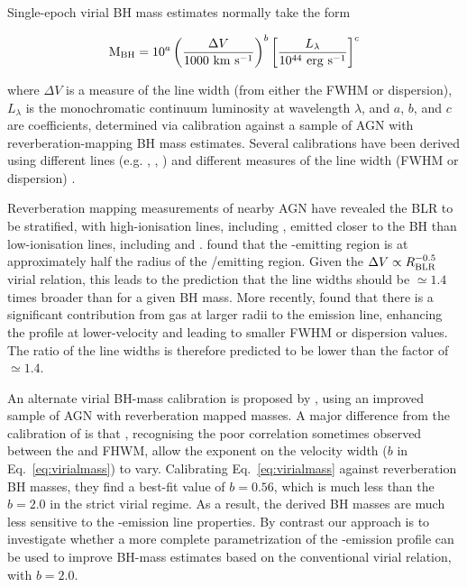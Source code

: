 Single-epoch virial BH mass estimates normally take the form

\begin{equation}
  \label{eq:virialmass}
  {\rm M_{BH}} = 10^{a} \left( \frac{\Delta V}{1000~{\rm km~s^{-1}}} \right)^b \left[ \frac{L_{\lambda}}{10^{44}~{\rm erg~s^{-1}}} \right]^c
\end{equation}

\noindent where $\Delta V$ is a measure of the line width (from either the FWHM or dispersion), $L_\lambda$ is the monochromatic continuum luminosity at wavelength $\lambda$, and $a$, $b$, and $c$ are coefficients, determined via calibration against a sample of AGN with reverberation-mapping BH mass estimates. Several calibrations have been derived using different lines (e.g. \hbns, , ) and different measures of the line width (FWHM or dispersion) \citep[e.g.][]{vestergaard02,mclure02,vestergaard06,mcgill08,wang09,rafiee11,park13}.

Reverberation mapping measurements of nearby AGN have revealed the BLR to be stratified, with high-ionisation lines, including , emitted closer to the BH than low-ionisation lines, including \ha and \hb \citep[e.g.][]{onken02}.
\citet{vestergaard06} found that the -emitting region is at approximately half the radius of the \hbns/\ha emitting region.
Given the $\Delta V \propto R_{\rm BLR}^{-0.5}$ virial relation, this leads to the prediction that the  line widths should be $\simeq 1.4$ times broader than \ha for a given BH mass. 
More recently, \citet{denney12} found that there is a significant contribution from gas at larger radii to the  emission line, enhancing the profile at lower-velocity and leading to smaller FWHM or dispersion values. 
The ratio of the line widths is therefore predicted to be lower than the factor of $\simeq 1.4$. 

An alternate virial BH-mass calibration is proposed by \citet{park13}, using an improved sample of AGN with reverberation mapped masses. 
A major difference from the calibration of \citet{vestergaard06} is that \citet{park13}, recognising the poor correlation sometimes observed between the  and \hb FHWM, allow the exponent on the velocity width ($b$ in Eq.~\ref{eq:virialmass}) to vary.
Calibrating Eq.~\ref{eq:virialmass} against reverberation BH masses, they find a best-fit value of $b=0.56$, which is much less than the $b=2.0$ in the strict virial regime. 
As a result, the derived BH masses are much less sensitive to the -emission line properties.
By contrast our approach is to investigate whether a more complete parametrization of the -emission profile can be used to improve BH-mass estimates based on the conventional virial relation, with $b=2.0$.


